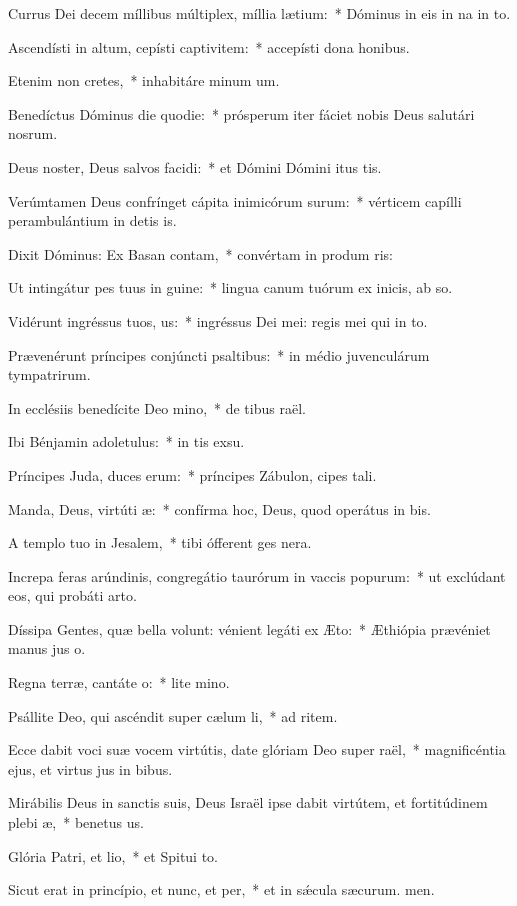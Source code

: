\item Currus Dei decem míllibus múltiplex, míllia lætium:~* Dóminus in eis in na in to.
\item Ascendísti in altum, cepísti captivitem:~* accepísti dona  honibus.
\item Etenim non cretes,~* inhabitáre minum um.
\item Benedíctus Dóminus die quodie:~* prósperum iter fáciet nobis Deus salutári nosrum.
\item Deus noster, Deus salvos facidi:~* et Dómini Dómini itus tis.
\item Verúmtamen Deus confrínget cápita inimicórum surum:~* vérticem capílli perambulántium in detis is.
\item Dixit Dóminus: Ex Basan contam,~* convértam in produm ris:
\item Ut intingátur pes tuus in guine:~* lingua canum tuórum ex inicis, ab so.
\item Vidérunt ingréssus tuos, us:~* ingréssus Dei mei: regis mei qui  in to.
\item Prævenérunt príncipes conjúncti psaltibus:~* in médio juvenculárum tympatrirum.
\item In ecclésiis benedícite Deo mino,~* de tibus raël.
\item Ibi Bénjamin adoletulus:~* in tis exsu.
\item Príncipes Juda, duces erum:~* príncipes Zábulon, cipes tali.
\item Manda, Deus, virtúti æ:~* confírma hoc, Deus, quod operátus  in bis.
\item A templo tuo in Jesalem,~* tibi ófferent ges nera.
\item Increpa feras arúndinis, congregátio taurórum in vaccis popurum:~* ut exclúdant eos, qui probáti  arto.
\item Díssipa Gentes, quæ bella volunt: vénient legáti ex Æto:~* Æthiópia prævéniet manus jus o.
\item Regna terræ, cantáte o:~* lite mino.
\item Psállite Deo, qui ascéndit super cælum li,~* ad ritem.
\item Ecce dabit voci suæ vocem virtútis, date glóriam Deo super raël,~* magnificéntia ejus, et virtus jus in bibus.
\item Mirábilis Deus in sanctis suis, Deus Israël ipse dabit virtútem, et fortitúdinem plebi æ,~* benetus us.
\item Glória Patri, et lio,~* et Spitui to.
\item Sicut erat in princípio, et nunc, et per,~* et in sǽcula sæcurum. men.

